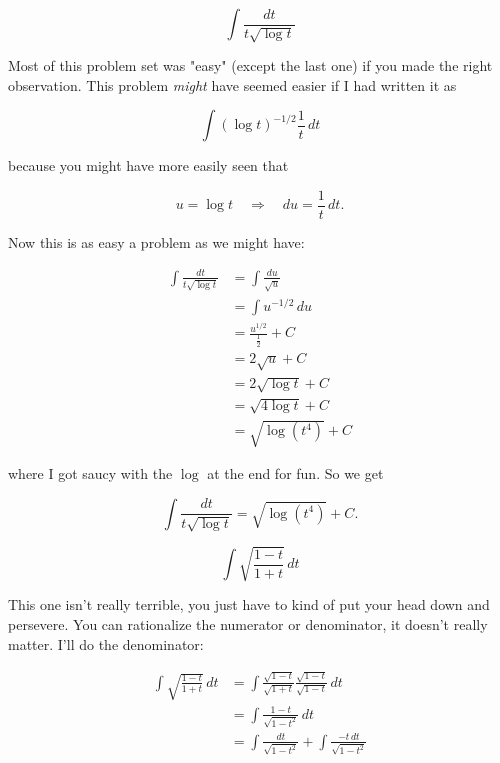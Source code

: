 \documentclass[12pt, letterpaper]{article}
\begin{document}
$$ \int \frac{dt}{t\sqrt{\log{t}}} $$

Most of this problem set was "easy" (except the last one) if you made the right observation. This problem \emph{might} have seemed easier if I had written it as

\begin{equation*}
\int \left( \log{t} \right)^{-1/2} \frac{1}{t} \, dt
\end{equation*}

because you might have more easily seen that

\begin{equation*}
u = \log{t} \quad \Rightarrow \quad du = \frac{1}{t} \, dt.
\end{equation*}

Now this is as easy a problem as we might have:


\begin{equation*}
\begin{aligned}
\int \frac{dt}{t\sqrt{\log{t}}}
  &= \int \frac{du}{\sqrt{u}} \\[0.2in]
  &= \int u^{-1/2} \, du \\[0.2in]
  &= \frac{u^{1/2}}{\frac{1}{2}} + C \\[0.2in]
  &= 2\sqrt{u} + C \\[0.2in]
  &= 2\sqrt{\log{t}} + C \\[0.2in]
  &= \sqrt{4\log{t}} + C \\[0.2in]
  &= \sqrt{\log{\left( t^4 \right)}} + C
\end{aligned}
\end{equation*}

where I got saucy with the $\log$ at the end for fun. So we get

\begin{equation*}
\boxed
{
\int \frac{dt}{t\sqrt{\log{t}}}
  = \sqrt{\log{\left( t^4 \right)}} + C.
}
\end{equation*}



\newpage

$$ \int \sqrt{\frac{1 - t}{1 + t}} \, dt $$

This one isn't really terrible, you just have to kind of put your head down and persevere. You can rationalize the numerator or denominator, it doesn't really matter. I'll do the denominator:

\begin{equation*}
\begin{aligned}
\int \sqrt{\frac{1 - t}{1 + t}} \, dt
  &= \int \frac{\sqrt{1 - t}}{\sqrt{1 + t}}\frac{\sqrt{1 - t}}{\sqrt{1 - t}} \, dt \\[0.2in]
  &= \int \frac{1-t}{\sqrt{1 - t^2}} \, dt \\[0.2in]
  &= \int \frac{dt}{\sqrt{1 - t^2}} + \int \frac{-t \, dt}{\sqrt{1 - t^2}}
\end{aligned}
\end{equation*}
\end{document}
